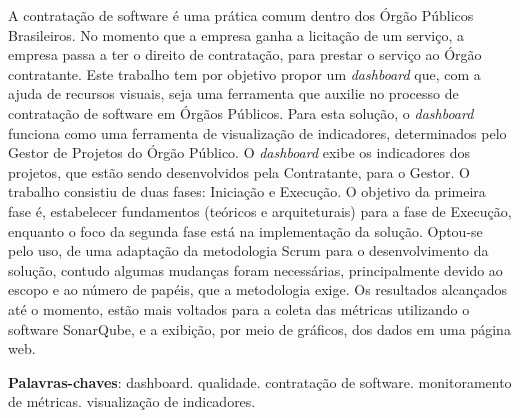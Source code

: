 \begin{resumo}
A contratação de software é uma prática comum dentro dos Órgão Públicos Brasileiros. No momento que a empresa ganha a licitação de um serviço, a empresa passa a ter o direito de contratação, para prestar o serviço ao Órgão contratante. Este trabalho tem por objetivo propor um \textit{dashboard} que, com a ajuda de recursos visuais, seja uma ferramenta que auxilie no processo de contratação de software em Órgãos Públicos. Para esta solução, o \textit{dashboard} funciona como uma ferramenta de visualização de indicadores, determinados pelo Gestor de Projetos do Órgão Público. O \textit{dashboard} exibe os indicadores dos projetos, que estão sendo desenvolvidos pela Contratante, para o Gestor. O trabalho consistiu de duas fases: Iniciação e Execução. O objetivo da primeira fase é, estabelecer fundamentos (teóricos e arquiteturais) para a fase de Execução, enquanto o foco da segunda fase está na implementação da solução. Optou-se pelo uso, de uma adaptação da metodologia Scrum para o desenvolvimento da solução, contudo algumas mudanças foram necessárias, principalmente devido ao escopo e ao número de papéis, que a metodologia exige. Os resultados alcançados até o momento, estão mais voltados para a coleta das métricas utilizando o software SonarQube, e a exibição, por meio de gráficos, dos dados em uma página web. 
 \vspace{\onelineskip}
 
    
 \noindent
 \textbf{Palavras-chaves}: dashboard. qualidade. contratação de software. monitoramento de métricas. visualização de indicadores.

\end{resumo}
